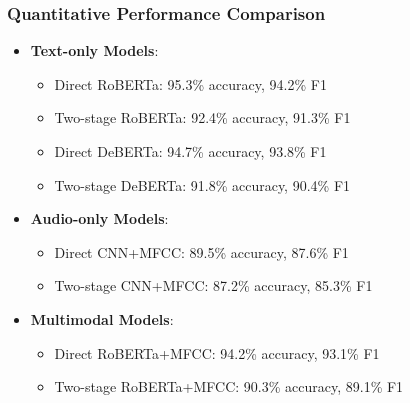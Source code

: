 \begin{frame}
\frametitle{Quantitative Performance Comparison}
\begin{itemize}
    \item \textbf{Text-only Models}:
    \begin{itemize}
        \item Direct RoBERTa: 95.3\% accuracy, 94.2\% F1
        \item Two-stage RoBERTa: 92.4\% accuracy, 91.3\% F1
        \item Direct DeBERTa: 94.7\% accuracy, 93.8\% F1
        \item Two-stage DeBERTa: 91.8\% accuracy, 90.4\% F1
    \end{itemize}
    \item \textbf{Audio-only Models}:
    \begin{itemize}
        \item Direct CNN+MFCC: 89.5\% accuracy, 87.6\% F1
        \item Two-stage CNN+MFCC: 87.2\% accuracy, 85.3\% F1
    \end{itemize}
    \item \textbf{Multimodal Models}:
    \begin{itemize}
        \item Direct RoBERTa+MFCC: 94.2\% accuracy, 93.1\% F1
        \item Two-stage RoBERTa+MFCC: 90.3\% accuracy, 89.1\% F1
    \end{itemize}
\end{itemize}
\end{frame}

